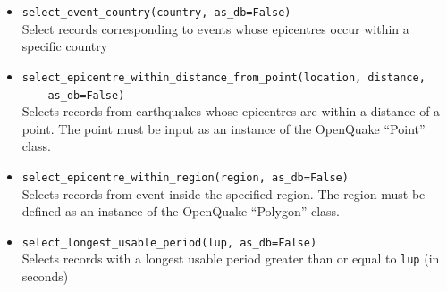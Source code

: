 \begin{itemize}
\item \verb;select_event_country(country, as_db=False);\\

Select records corresponding to events whose epicentres occur within a specific country

\item \verb;select_epicentre_within_distance_from_point(location, distance,;\\
\verb;    as_db=False);\\

Selects records from earthquakes whose epicentres are within a distance of a point. The point must be input as an instance of the OpenQuake ``Point'' class.

\item \verb;select_epicentre_within_region(region, as_db=False);\\

Selects records from event inside the specified region. The region must be defined as an instance of the OpenQuake ``Polygon'' class.

\item \verb;select_longest_usable_period(lup, as_db=False);\\

Selects records with a longest usable period greater than or equal to \verb=lup= (in seconds)

\end{itemize}
